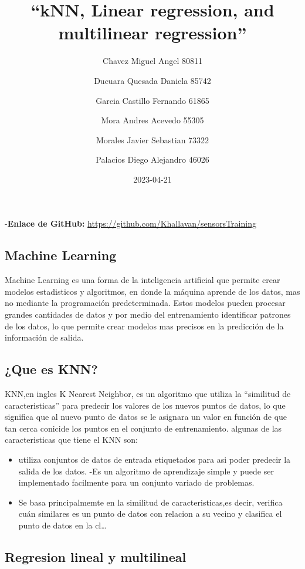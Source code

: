 \documentclass[
]{article}
\title{``kNN, Linear regression, and multilinear regression''}
\author{Chavez Miguel Angel 80811 \and Ducuara Quesada Daniela
85742 \and Garcia Castillo Fernando 61865 \and Mora Andres Acevedo
55305 \and Morales Javier Sebastian 73322 \and Palacios Diego Alejandro
46026}
\date{2023-04-21}
\providecommand{\tightlist}{%
  \setlength{\itemsep}{0pt}\setlength{\parskip}{0pt}}
\begin{document}
\maketitle

-\textbf{Enlace de GitHub:}
\url{https://github.com/Khallavan/sensorsTraining}

\hypertarget{machine-learning}{%
\subsection{Machine Learning}\label{machine-learning}}

Machine Learning es una forma de la inteligencia artificial que permite
crear modelos estadisticos y algoritmos, en donde la máquina aprende de
los datos, mas no mediante la programación predeterminada. Estos modelos
pueden procesar grandes cantidades de datos y por medio del
entrenamiento identificar patrones de los datos, lo que permite crear
modelos mas precisos en la predicción de la información de salida.

\hypertarget{que-es-knn}{%
\subsection{¿Que es KNN?}\label{que-es-knn}}

KNN,en ingles K Nearest Neighbor, es un algoritmo que utiliza la
``similitud de caracteristicas'' para predecir los valores de los nuevos
puntos de datos, lo que significa que al nuevo punto de datos se le
asignara un valor en función de que tan cerca conicide los puntos en el
conjunto de entrenamiento. algunas de las caracteristicas que tiene el
KNN son:

\begin{itemize}
\tightlist
\item
  utiliza conjuntos de datos de entrada etiquetados para asi poder
  predecir la salida de los datos. -Es un algoritmo de aprendizaje
  simple y puede ser implementado facilmente para un conjunto variado de
  problemas.
\item
  Se basa principalmemte en la similitud de caracteristicas,es decir,
  verifica cuán similares es un punto de datos con relacion a su vecino
  y clasifica el punto de datos en la cl\ldots{}
\end{itemize}

\hypertarget{regresion-lineal-y-multilineal}{%
\subsection{Regresion lineal y
multilineal}\label{regresion-lineal-y-multilineal}}
\end{document}
